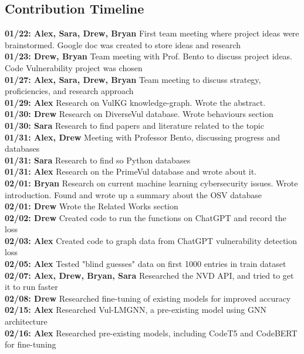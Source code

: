 \documentclass{article}
\begin{document}
\subsection{Contribution Timeline}
\textbf{01/22: Alex, Sara, Drew, Bryan} First team meeting where project ideas were
brainstormed. Google doc was created to store ideas and research \\
\textbf{01/23: Drew, Bryan} Team meeting with Prof. Bento to discuss project ideas.
Code Vulnerability project was chosen \\
\textbf{01/27: Alex, Sara, Drew, Bryan} Team meeting to discuss strategy, proficiencies, 
and research approach \\
\textbf{01/29: Alex} Research on VulKG knowledge-graph. Wrote the abstract. \\
\textbf{01/30: Drew} Research on DiverseVul database. Wrote behaviours section \\
\textbf{01/30: Sara} Research to find papers and literature related to the topic \\
\textbf{01/31: Alex, Drew} Meeting with Professor Bento, discussing progress and databases \\
\textbf{01/31: Sara} Research to find so Python databases \\
\textbf{01/31: Alex} Research on the PrimeVul database and wrote about it. \\
\textbf{02/01: Bryan} Research on current machine learning cybersecurity issues. Wrote
introduction. Found and wrote up a summary about the OSV database \\
\textbf{02/01: Drew} Wrote the Related Works section \\
\textbf{02/02: Drew} Created code to run the functions on ChatGPT and record the loss \\
\textbf{02/03: Alex} Created code to graph data from ChatGPT vulnerability detection loss \\
\textbf{02/05: Alex} Tested "blind guesses" data on first 1000 entries in train dataset \\
\textbf{02/07: Alex, Drew, Bryan, Sara} Researched the NVD API, and tried to get it to run faster \\
\textbf{02/08: Drew} Researched fine-tuning of existing models for improved accuracy \\
\textbf{02/15: Alex} Researched Vul-LMGNN, a pre-existing model using GNN architecture \\
\textbf{02/16: Alex} Researched pre-existing models, including CodeT5 and CodeBERT for fine-tuning \\
\end{document}

